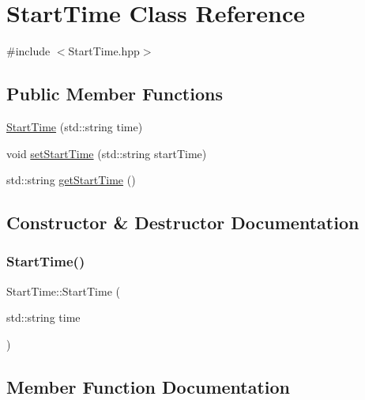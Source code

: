 \hypertarget{class_start_time}{}\section{Start\+Time Class Reference}
\label{class_start_time}


{\ttfamily \#include $<$Start\+Time.\+hpp$>$}

\subsection*{Public Member Functions}
\begin{DoxyCompactItemize}
\item 
\mbox{\hyperlink{class_start_time_ad8209b406c1bd41cd5b71911181b9162}{Start\+Time}} (std\+::string time)
\item 
void \mbox{\hyperlink{class_start_time_ad6692d66a7c97d3a58f6d7b5b56880bc}{set\+Start\+Time}} (std\+::string start\+Time)
\item 
std\+::string \mbox{\hyperlink{class_start_time_a0a58ef81a90d0f58a7957e49dfa88684}{get\+Start\+Time}} ()
\end{DoxyCompactItemize}


\subsection{Constructor \& Destructor Documentation}
\mbox{\label{class_start_time_ad8209b406c1bd41cd5b71911181b9162}} 
\subsubsection{\texorpdfstring{StartTime()}{StartTime()}}
{\footnotesize\ttfamily Start\+Time\+::\+Start\+Time (\begin{DoxyParamCaption}\item[{std\+::string}]{time }\end{DoxyParamCaption})}



\subsection{Member Function Documentation}
\mbox{\label{class_start_time_a0a58ef81a90d0f58a7957e49dfa88684}} 
